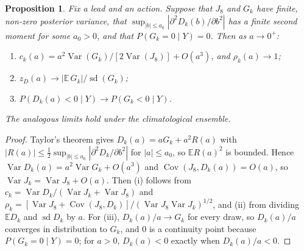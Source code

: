 \documentclass[11pt]{article}
\newtheorem{proposition}{Proposition}
\begin{document}
\begin{proposition}
\label{prop:small}
Fix a lead and an action. Suppose that $J_8$ and $G_k$ have finite, non-zero posterior variance, that $\sup_{|b| \le a_0} |\partial^2 D_k(b)/\partial b^2|$ has a finite second moment for some $a_0 > 0$, and that $P(G_k = 0 \mid Y) = 0$. Then as $a \to 0^+$:
\begin{enumerate}
\item[(i)] $c_k(a) = a^2 \operatorname{Var}(G_k) / [2 \operatorname{Var}(J_8)] + O(a^3)$, and $\rho_k(a) \to 1$;
\item[(ii)] $z_D(a) \to |\mathbb E\, G_k| / \operatorname{sd}(G_k)$;
\item[(iii)] $P(D_k(a) < 0 \mid Y) \to P(G_k < 0 \mid Y)$.
\end{enumerate}
The analogous limits hold under the climatological ensemble.
\end{proposition}

\begin{proof}
Taylor's theorem gives $D_k(a) = a G_k + a^2 R(a)$ with $|R(a)| \le \frac12 \sup_{|b| \le a_0} |\partial^2 D_k/\partial b^2|$ for $|a| \le a_0$, so $\mathbb E R(a)^2$ is bounded. Hence $\operatorname{Var} D_k(a) = a^2 \operatorname{Var} G_k + O(a^3)$ and $\operatorname{Cov}(J_8, D_k(a)) = O(a)$, so $\operatorname{Var} J_k = \operatorname{Var} J_8 + O(a)$. Then (i) follows from $c_k = \operatorname{Var} D_k / (\operatorname{Var} J_k + \operatorname{Var} J_8)$ and $\rho_k = [\operatorname{Var} J_8 + \operatorname{Cov}(J_8, D_k)] / (\operatorname{Var} J_8 \operatorname{Var} J_k)^{1/2}$, and (ii) from dividing $\mathbb E D_k$ and $\operatorname{sd} D_k$ by $a$. For (iii), $D_k(a)/a \to G_k$ for every draw, so $D_k(a)/a$ converges in distribution to $G_k$, and 0 is a continuity point because $P(G_k = 0 \mid Y) = 0$; for $a > 0$, $D_k(a) < 0$ exactly when $D_k(a)/a < 0$.
\end{proof}
\end{document}
